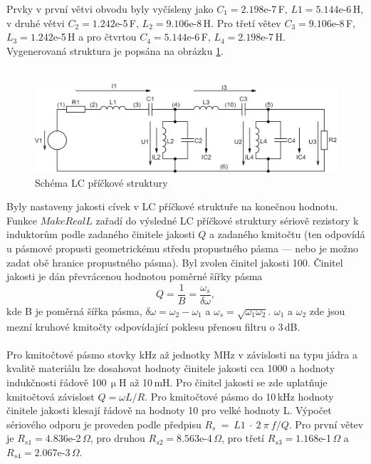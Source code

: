 Prvky v první větvi obvodu byly vyčísleny jako $C_1 = 2.198$e-7\,F, $L1 = 5.144$e-6\,H, v druhé větvi $C_2 = 1.242$e-5\,F, $L_2 = 9.106$e-8\,H. Pro třetí větev $C_3 = 9.106$e-8\,F, $L_3 = 1.242$e-5\,H a pro čtvrtou $C_4 = 5.144$e-6\,F, $L_4 = 2.198$e-7\,H.\\
\noindent Vygenerovaná struktura je popsána na obrázku \ref{s:SCHEM1}.\\
\\
\begin{figure}[h]
\centering
\includegraphics[scale=0.3]{Circuit(4).png}
\caption{Schéma LC příčkové struktury \label{s:SCHEM1}}
\end{figure}
\noindent Byly nastaveny jakosti cívek v LC příčkové struktuře na konečnou hodnotu. Funkce $MakeRealL$ zařadí do výsledné LC příčkové struktury sériově rezistory k induktorům podle zadaného činitele jakosti $Q$ a zadaného kmitočtu (ten odpovídá u pásmové propusti geometrickému středu propustného pásma --- nebo je možno zadat obě hranice propustného pásma). Byl zvolen činitel jakosti 100. Činitel jakosti je dán převrácenou hodnotou poměrné šířky pásma
\begin{equation}
Q = \frac{1}{B} = \frac{\omega_s}{\delta \omega},
\end{equation}
kde B je poměrná šířka pásma, $\delta \omega = \omega_2 - \omega_1$ a $\omega_s = \sqrt{\omega_1\omega_2}$. $\omega_1$ a $\omega_2$ zde jsou mezní kruhové kmitočty odpovídající poklesu přenosu filtru o 3\,dB.\\
\\
Pro kmitočtové pásmo stovky kHz až jednotky MHz v závislosti na typu jádra a kvalitě materiálu lze dosahovat hodnoty činitele jakosti cca 1000 a hodnoty indukčnosti řádově 100\,$\upmu$H až 10\,mH. Pro činitel jakosti se zde uplatňuje kmitočtová závislost $Q = \omega L/R$. Pro kmitočtové pásmo do 10\,kHz hodnoty činitele jakosti klesají řádově na hodnoty 10 pro velké hodnoty L. Výpočet sériového odporu je proveden podle předpisu $R_s~=~L1~\cdot~2~\pi~f/Q$. Pro první větev je $R_{s1} = 4.836$e-2\,$\Omega$, pro druhou $R_{s2} = 8.563$e-4\,$\Omega$, pro třetí $R_{s3} = 1.168$e-1\,$\Omega$ a $R_{s4} = 2.067$e-3\,$\Omega$.\\
